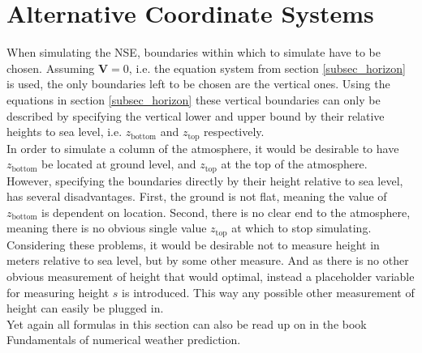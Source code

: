 
\section{Alternative Coordinate Systems}
When simulating the NSE, boundaries within which to simulate have to be chosen.
Assuming $\textbf{V}=0$, i.e. the equation system from section \ref{subsec_horizon} is used, the only boundaries left to be chosen are the vertical ones.
Using the equations in section \ref{subsec_horizon} these vertical boundaries can only be described by specifying the vertical lower and upper bound by their relative heights to sea level, i.e. $z_{\text{bottom}}$ and $z_{\text{top}}$ respectively.
\\
In order to simulate a column of the atmosphere, it would be desirable to have $z_{\text{bottom}}$ be located at ground level, and $z_{\text{top}}$ at the top of the atmosphere.
\\
However, specifying the boundaries directly by their height relative to sea level, has several disadvantages.
First, the ground is not flat, meaning the value of $z_{\text{bottom}}$ is dependent on location.
Second, there is no clear end to the atmosphere, meaning there is no obvious single value $z_{\text{top}}$ at which to stop simulating.
\\
Considering these problems, it would be desirable not to measure height in meters relative to sea level, but by some other measure.
And as there is no other obvious measurement of height that would optimal, instead a placeholder variable for measuring height $s$ is introduced.
This way any possible other measurement of height can easily be plugged in.\\
Yet again all formulas in this section can also be read up on in the book {Fundamentals of numerical weather prediction}\cite{coiffier2011fundamentals}.
